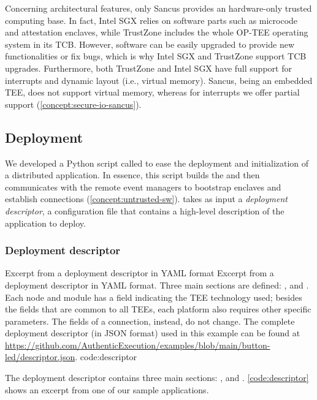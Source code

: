 Concerning architectural features, only Sancus provides an hardware-only trusted
computing base. In fact, Intel \ac{SGX} relies on software parts such as
microcode and attestation enclaves, while TrustZone includes the whole OP-TEE
operating system in its \ac{TCB}. However, software can be easily upgraded to
provide new functionalities or fix bugs, which is why Intel \ac{SGX} and
TrustZone support \ac{TCB} upgrades. Furthermore, both TrustZone and Intel
\ac{SGX} have full support for interrupts and dynamic layout (i.e., virtual
memory). Sancus, being an embedded \ac{TEE}, does not support virtual memory,
whereas for interrupts we offer partial support
(\cref{concept:secure-io-sancus}).

\subsection{Deployment}
%
\label{impl:deployment}

We developed a Python script called \reactools{} to ease the deployment and
initialization of a distributed application. In essence, this script
builds the \protmods{} and then communicates with the remote event managers to
bootstrap enclaves and establish connections (\cref{concept:untrusted-sw}).
\reactools{} takes as input a \emph{deployment descriptor}, a configuration file
that contains a high-level description of the application to deploy. 

\subsubsection{Deployment descriptor} 

%
  {}%
  {Excerpt from a deployment descriptor in YAML format}%
  {Excerpt from a deployment descriptor in YAML format. Three main sections are
  defined: ,  and . Each node and
  module has a  field indicating the \ac{TEE} technology used;
  besides the fields that are common to all \acp{TEE}, each platform also
  requires other specific parameters. The fields of a connection, instead, do
  not change. The complete deployment descriptor (in JSON format) used in this
  example  can be found at
  \url{https://github.com/AuthenticExecution/examples/blob/main/button-led/descriptor.json}.}%
  {code:descriptor}

The deployment descriptor contains three main sections: ,
 and . \cref{code:descriptor} shows an excerpt
from one of our sample applications. 

